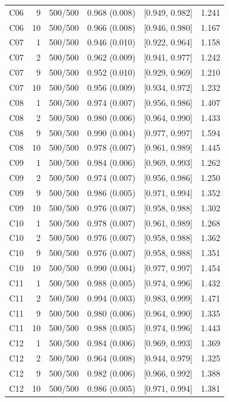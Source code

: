 \begin{longtable}[t]{lrllll}
C06 & 9 & 500/500 & 0.968 (0.008) & {}[0.949, 0.982] & 1.241\\
C06 & 10 & 500/500 & 0.966 (0.008) & {}[0.946, 0.980] & 1.167\\
C07 & 1 & 500/500 & 0.946 (0.010) & {}[0.922, 0.964] & 1.158\\
C07 & 2 & 500/500 & 0.962 (0.009) & {}[0.941, 0.977] & 1.242\\
C07 & 9 & 500/500 & 0.952 (0.010) & {}[0.929, 0.969] & 1.210\\
C07 & 10 & 500/500 & 0.956 (0.009) & {}[0.934, 0.972] & 1.232\\
C08 & 1 & 500/500 & 0.974 (0.007) & {}[0.956, 0.986] & 1.407\\
C08 & 2 & 500/500 & 0.980 (0.006) & {}[0.964, 0.990] & 1.433\\
C08 & 9 & 500/500 & 0.990 (0.004) & {}[0.977, 0.997] & 1.594\\
C08 & 10 & 500/500 & 0.978 (0.007) & {}[0.961, 0.989] & 1.445\\
C09 & 1 & 500/500 & 0.984 (0.006) & {}[0.969, 0.993] & 1.262\\
C09 & 2 & 500/500 & 0.974 (0.007) & {}[0.956, 0.986] & 1.250\\
C09 & 9 & 500/500 & 0.986 (0.005) & {}[0.971, 0.994] & 1.352\\
C09 & 10 & 500/500 & 0.976 (0.007) & {}[0.958, 0.988] & 1.302\\
C10 & 1 & 500/500 & 0.978 (0.007) & {}[0.961, 0.989] & 1.268\\
C10 & 2 & 500/500 & 0.976 (0.007) & {}[0.958, 0.988] & 1.362\\
C10 & 9 & 500/500 & 0.976 (0.007) & {}[0.958, 0.988] & 1.351\\
C10 & 10 & 500/500 & 0.990 (0.004) & {}[0.977, 0.997] & 1.454\\
C11 & 1 & 500/500 & 0.988 (0.005) & {}[0.974, 0.996] & 1.432\\
C11 & 2 & 500/500 & 0.994 (0.003) & {}[0.983, 0.999] & 1.471\\
C11 & 9 & 500/500 & 0.980 (0.006) & {}[0.964, 0.990] & 1.335\\
C11 & 10 & 500/500 & 0.988 (0.005) & {}[0.974, 0.996] & 1.443\\
C12 & 1 & 500/500 & 0.984 (0.006) & {}[0.969, 0.993] & 1.369\\
C12 & 2 & 500/500 & 0.964 (0.008) & {}[0.944, 0.979] & 1.325\\
C12 & 9 & 500/500 & 0.982 (0.006) & {}[0.966, 0.992] & 1.388\\
C12 & 10 & 500/500 & 0.986 (0.005) & {}[0.971, 0.994] & 1.381\\

\end{longtable}
